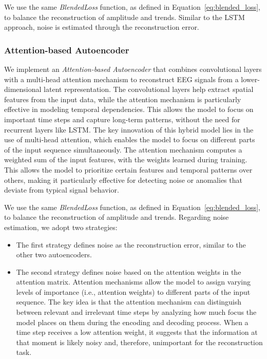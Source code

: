 We use the same \emph{BlendedLoss} function, as defined in Equation~\ref{eq:blended_loss}, to balance the reconstruction of amplitude and trends. Similar to the LSTM approach, noise is estimated through the reconstruction error.

\subsubsection{Attention-based Autoencoder}

We implement an \emph{Attention-based Autoencoder} that combines convolutional layers with a multi-head attention mechanism to reconstruct EEG signals from a lower-dimensional latent representation. The convolutional layers help extract spatial features from the input data, while the attention mechanism is particularly effective in modeling temporal dependencies. This allows the model to focus on important time steps and capture long-term patterns, without the need for recurrent layers like LSTM. The key innovation of this hybrid model lies in the use of multi-head attention, which enables the model to focus on different parts of the input sequence simultaneously. The attention mechanism computes a weighted sum of the input features, with the weights learned during training. This allows the model to prioritize certain features and temporal patterns over others, making it particularly effective for detecting noise or anomalies that deviate from typical signal behavior.

We use the same \emph{BlendedLoss} function, as defined in Equation~\ref{eq:blended_loss}, to balance the reconstruction of amplitude and trends. Regarding noise estimation, we adopt two strategies:

\begin{itemize}
    \item The first strategy defines noise as the reconstruction error, similar to the other two autoencoders.
    \vspace{-0.2cm}
    \item The second strategy defines noise based on the attention weights in the attention matrix. Attention mechanisms allow the model to assign varying levels of importance (i.e., attention weights) to different parts of the input sequence. The key idea is that the attention mechanism can distinguish between relevant and irrelevant time steps by analyzing how much focus the model places on them during the encoding and decoding process. When a time step receives a low attention weight, it suggests that the information at that moment is likely noisy and, therefore, unimportant for the reconstruction task.
\end{itemize}

